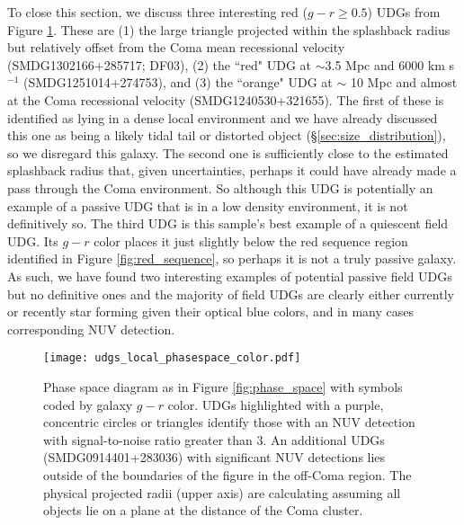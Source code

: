 \documentclass[twocolumn,tighten]{aastex63}
\begin{document}
To close this section, we
discuss three interesting red ($g-r \ge 0.5$) UDGs from 
Figure \ref{fig:udgs_local_phasespace_color}. These are (1) the large triangle projected within the splashback radius but relatively offset from the Coma mean recessional velocity (SMDG1302166+285717; DF03), (2) the ``red" UDG at $\sim$3.5 Mpc and 6000 km s$^{-1}$ (SMDG1251014+274753),  and (3) the ``orange" UDG at $\sim$ 10 Mpc and almost at the Coma recessional velocity (SMDG1240530+321655). The first of these is identified as lying in a dense local environment and we have already discussed this one as being a likely tidal tail or distorted object (\S\ref{sec:size_distribution}), so we disregard this galaxy. The second one is sufficiently close to the estimated splashback radius that, given uncertainties, perhaps it could have already made a pass through the Coma environment. So although this UDG is potentially an example of a passive UDG that is in a low density environment, it is not definitively so. The third UDG is this sample's best example of a quiescent field UDG. Its $g-r$ color places it just slightly below the red sequence region identified in Figure \ref{fig:red_sequence}, so perhaps it is not a truly passive galaxy. As such, we have found two interesting examples of potential passive field UDGs but no definitive ones and the majority of field UDGs are clearly either currently or recently star forming given their optical blue colors, and in many cases corresponding NUV detection.

\begin{figure}
\texttt{[image: udgs\_local\_phasespace\_color.pdf]}
\caption{Phase space diagram as in Figure \ref{fig:phase_space} with symbols coded by galaxy $g-r$ color. UDGs highlighted with a purple, concentric circles or triangles identify those with an NUV detection with signal-to-noise ratio greater than 3. An additional UDGs (SMDG0914401+283036) with significant NUV detections lies outside of the boundaries of the figure in the off-Coma region. The physical projected radii (upper axis) are calculating assuming all objects lie on a plane at the distance of the Coma cluster.}
\label{fig:udgs_local_phasespace_color}
\end{figure}
\end{document}
